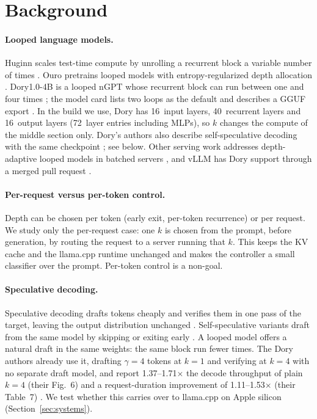 \documentclass[11pt]{article}
\newcommand{\LayersIn}{16}
\newcommand{\LayersRec}{40}
\newcommand{\LayersOut}{16}
\newcommand{\LayersAll}{72}
\newcommand{\DorySpecLo}{1.37}%
\newcommand{\DorySpecHi}{1.71}%
\newcommand{\DoryReqLo}{1.11}%
\newcommand{\DoryReqHi}{1.53}%
\begin{document}
\section{Background}
\paragraph{Looped language models.}
Huginn scales test-time compute by unrolling a recurrent block a variable number of times \citep{huginn2025}. Ouro pretrains looped models with entropy-regularized depth allocation \citep{ouro2025}. Dory1.0-4B is a looped nGPT \citep{ngpt2024} whose recurrent block can run between one and four times \citep{dory2026}; the model card lists two loops as the default and describes a GGUF export \citep{dorycard}. In the build we use, Dory has \LayersIn\ input layers, \LayersRec\ recurrent layers and \LayersOut\ output layers (\LayersAll\ layer entries including MLPs), so $k$ changes the compute of the middle section only. Dory's authors also describe self-speculative decoding with the same checkpoint \citep[Sec.~6.2]{dory2026}; see below. Other serving work addresses depth-adaptive looped models in batched servers \citep{cdb2026}, and vLLM has Dory support through a merged pull request \citep{vllm60149}.

\paragraph{Per-request versus per-token control.}
Depth can be chosen per token (early exit, per-token recurrence) or per request. We study only the per-request case: one $k$ is chosen from the prompt, before generation, by routing the request to a server running that $k$. This keeps the KV cache and the llama.cpp runtime unchanged and makes the controller a small classifier over the prompt. Per-token control is a non-goal.

\paragraph{Speculative decoding.}
Speculative decoding drafts tokens cheaply and verifies them in one pass of the target, leaving the output distribution unchanged \citep{leviathan2023}. Self-speculative variants draft from the same model by skipping or exiting early \citep{draftverify2024,layerskip2024}. A looped model offers a natural draft in the same weights: the same block run fewer times. The Dory authors already use it, drafting $\gamma{=}4$ tokens at $k{=}1$ and verifying at $k{=}4$ with no separate draft model, and report \DorySpecLo--\DorySpecHi$\times$ the decode throughput of plain $k{=}4$ (their Fig.~6) and a request-duration improvement of \DoryReqLo--\DoryReqHi$\times$ (their Table~7) \citep[Sec.~6.2]{dory2026}. We test whether this carries over to llama.cpp on Apple silicon (Section~\ref{sec:systems}).
\end{document}

